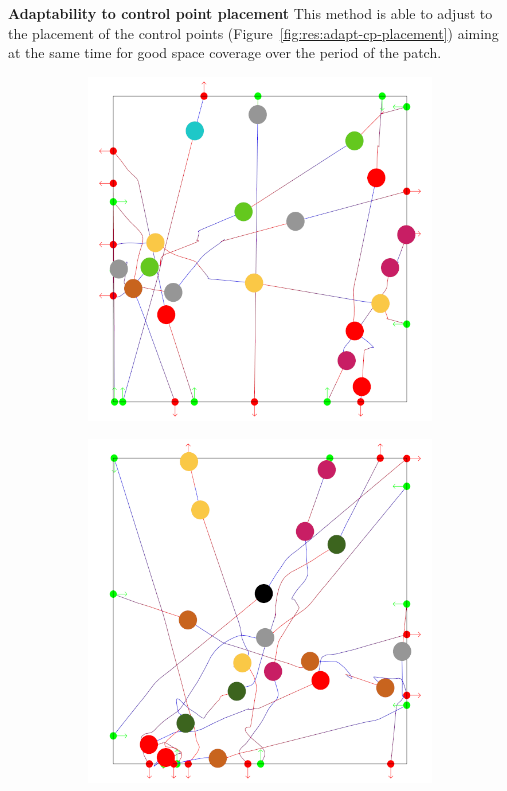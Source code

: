 
\textbf{Adaptability to control point placement}
This method is able to adjust to the placement of the control points (Figure~\ref{fig:res:adapt-cp-placement}) aiming at the same time for good space coverage over the period of the patch.


\begin{figure}[t]
 \centering
 \begin{subfigure}[b]{0.24\linewidth}
 	\includegraphics[width=\linewidth]{images/res-10-withAgents_1.png}
 	\caption{}
 \end{subfigure}
 \begin{subfigure}[b]{0.24\linewidth}
 	\includegraphics[width=\linewidth]{images/res-10-withAgents_2.png}

\end{subfigure}
\end{figure}
